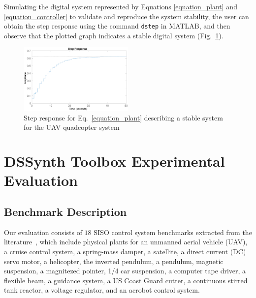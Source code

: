 \documentclass[10pt,conference]{IEEEtran}
\newcommand\tool{{DSSynth Toolbox}\xspace}
\begin{document}
Simulating the digital system represented by Equations
\eqref{equation_plant} and \eqref{equation_controller} to validate and
reproduce the system stability, the user can obtain the step response using
the command \texttt{dstep} in MATLAB, and then observe that the plotted
graph indicates a stable digital system (Fig.~\ref{step-response}).

\begin{figure}[ht]
  \includegraphics[width=0.5\textwidth]{step-response.eps}
  \caption{Step response for Eq.~\eqref{equation_plant} describing a stable system for the UAV quadcopter system}
  \label{step-response}
\end{figure}

\section{\tool Experimental Evaluation}

\subsection{Benchmark Description}
\label{benchmarks-description}

Our evaluation consists of $18$ SISO control system benchmarks extracted
from the literature~\cite{abate2017, abatecav2017, bouabdallah, acrobot,
cstr, KOKOTOVIC198023, gajic2008optimal, Franklin15, maglev, converters,
CTMS, DBLP:journals/tc/BessaIPCF17, DBLP:journals/dafes/BessaICF16}, which
include physical plants for an unmanned aerial vehicle (UAV), a cruise
control system, a spring-mass damper, a satellite, a direct current (DC)
servo motor, a helicopter, the inverted pendulum, a pendulum, magnetic
suspension, a magnitezed pointer, 1/4 car suspension, a computer tape
driver, a flexible beam, a guidance system, a US Coast Guard cutter, a
continuous stirred tank reactor, a voltage regulator, and an acrobot control
system.
\end{document}
